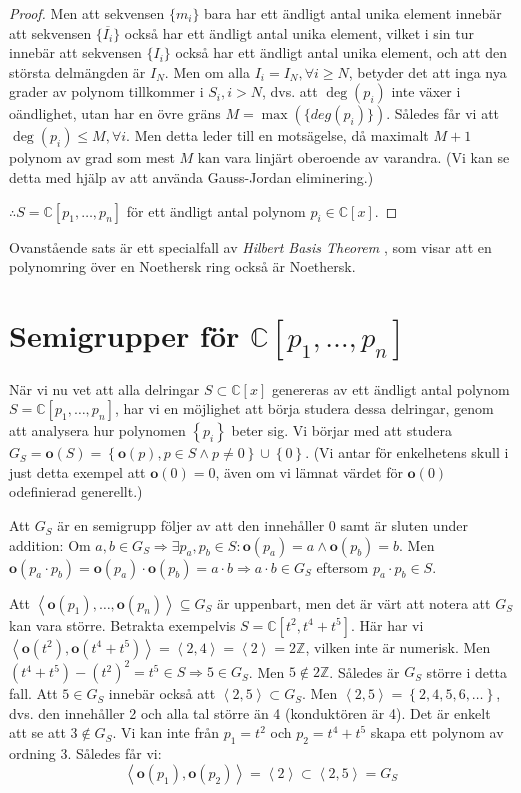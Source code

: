 \begin{proof}
Men att sekvensen $\{m_i\}$ bara har ett ändligt antal unika element innebär att sekvensen $\{\overline{I_i}\}$ också har ett ändligt antal unika element, vilket i sin tur innebär att sekvensen $\{I_i\}$ också har ett ändligt antal unika element, och att den största delmängden är $I_N$. Men om alla $I_i=I_N, \forall i \geq N$, betyder det att inga nya grader av polynom tillkommer i $S_i, i > N$, dvs. att $\deg(p_i)$ inte växer i oändlighet, utan har en övre gräns $M=\max(\{deg(p_i)\})$. Således får vi att $\deg(p_i) \leq M, \forall i$. Men detta leder till en motsägelse, då maximalt $M+1$ polynom av grad som mest $M$ kan vara linjärt oberoende av varandra. (Vi kan se detta med hjälp av att använda Gauss-Jordan eliminering.)

$\therefore S=\mathbb{C}\left[p_1,\ldots,p_n\right]$ för ett ändligt antal polynom $p_i \in \mathbb{C}\left[x\right]$.
\end{proof}

Ovanstående sats är ett specialfall av \emph{Hilbert Basis Theorem} \cite{HilbertBasisTheorem}, som visar att en polynomring över en Noethersk ring också är Noethersk.

\section{Semigrupper för $\mathbb{C}\left[p_1,\ldots,p_n\right]$}

När vi nu vet att alla delringar $S \subset \mathbb{C}\left[x\right]$ genereras av ett ändligt antal polynom $S=\mathbb{C}\left[p_1,\ldots,p_n\right]$, har vi en möjlighet att börja studera dessa delringar, genom att analysera hur polynomen $\left\{p_i\right\}$ beter sig. Vi börjar med att studera $G_S = \mathbf{o}(S) = \left\{\mathbf{o}(p), p \in S \wedge p \neq 0 \right\} \cup \left\{0\right\}$. (Vi antar för enkelhetens skull i just detta exempel att $\mathbf{o}(0)=0$, även om vi lämnat värdet för $\mathbf{o}(0)$ odefinierad generellt.)

Att $G_S$ är en semigrupp följer av att den innehåller $0$ samt är sluten under addition: Om $a,b\in G_S \Longrightarrow \exists p_a, p_b \in S:\mathbf{o}(p_a)=a \wedge \mathbf{o}(p_b)=b$. Men $\mathbf{o}(p_a \cdot p_b) = \mathbf{o}(p_a) \cdot \mathbf{o}(p_b) = a \cdot b \Longrightarrow a \cdot b \in G_S$ eftersom $p_a \cdot p_b \in S$.

Att $\left<\mathbf{o}(p_1),\ldots,\mathbf{o}(p_n)\right> \subseteq G_S$ är uppenbart, men det är värt att notera att $G_S$ kan vara större. Betrakta exempelvis $S=\mathbb{C}\left[t^2,t^4+t^5\right]$. Här har vi $\left<\mathbf{o}(t^2),\mathbf{o}(t^4+t^5)\right> = \left<2,4\right>=\left<2\right> = 2\mathbb{Z}$, vilken inte är numerisk. Men $\left(t^4+t^5\right)-\left(t^2\right)^2 = t^5 \in S \Longrightarrow 5 \in G_S$. Men $5 \notin 2\mathbb{Z}$. Således är $G_S$ större i detta fall. Att $5 \in G_S$ innebär också att $\left<2,5\right> \subset G_S$. Men $\left<2,5\right> = \left\{2, 4, 5, 6, \ldots\right\}$, dvs. den innehåller 2 och alla tal större än 4 (konduktören är 4). Det är enkelt att se att $3 \notin G_S$. Vi kan inte från $p_1=t^2$ och $p_2=t^4+t^5$ skapa ett polynom av ordning 3. Således får vi:
\[\left<\mathbf{o}(p_1),\mathbf{o}(p_2)\right> = \left<2\right> \subset \left<2,5\right> = G_S \]

